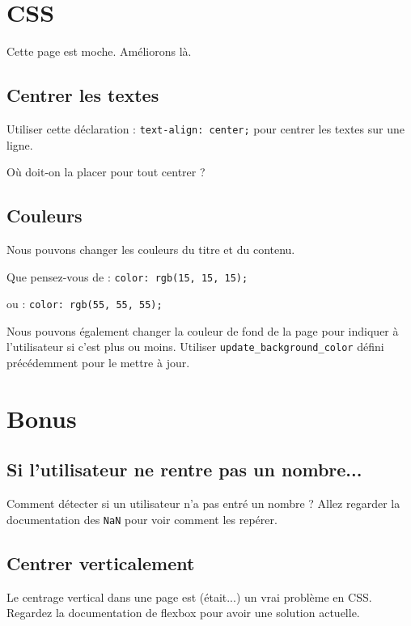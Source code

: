 \documentclass{article} %
\newcommand{\codeCSSinline}[2] {
	#1 : \texttt{#2} 
  }
\begin{document}
\section{CSS}

Cette page est moche. Améliorons là.

\subsection{Centrer les textes}

Utiliser \codeCSSinline{cette déclaration}{text-align: center;} pour centrer les textes sur une ligne. 

Où doit-on la placer pour tout centrer ?

\subsection{Couleurs}

Nous pouvons changer les couleurs du titre et du contenu. 

Que pensez-vous \codeCSSinline{de}{color: rgb(15, 15, 15);} \codeCSSinline{ou}{color: rgb(55, 55, 55);}

Nous pouvons également changer la couleur de fond de la page pour indiquer à l'utilisateur si c'est plus ou moins. Utiliser \texttt{update\_background\_color} défini précédemment pour le mettre à jour.

\section{Bonus}

\subsection{Si l'utilisateur ne rentre pas un nombre...}

Comment détecter si un utilisateur n'a pas entré un nombre ? Allez regarder la documentation des \texttt{NaN} pour voir comment les repérer.

\subsection{Centrer verticalement}

Le centrage vertical dans une page est (était...) un vrai problème en CSS. Regardez la documentation de flexbox pour avoir une solution actuelle.
\end{document}
